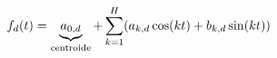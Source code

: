\documentclass[preview]{standalone}
\begin{document}
\begin{align*}
\special{dvisvgm:raw <g id='unique000'>}f_d(t) = \underbrace{a_{0,d}}_{\text{centroide}} + \sum_{k=1}^{H}\!\left(a_{k,d}\cos(kt)+b_{k,d}\sin(kt)\right)\special{dvisvgm:raw </g>}
\end{align*}
\end{document}

